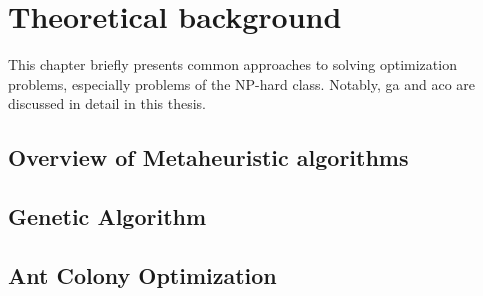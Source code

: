 \chapter{Theoretical background}
\label{chap:chap1}
This chapter briefly presents common approaches to solving optimization problems, especially problems of the NP-hard class. Notably, \acrfull{ga} and \acrfull{aco} are discussed in detail in this thesis.

\section{Overview of Metaheuristic algorithms}
\label{intro:overview}


\section{Genetic Algorithm}
\label{intro:ga}


\section{Ant Colony Optimization}
\label{intro:aco}
